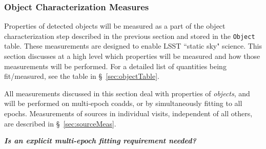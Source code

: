\documentclass[12pt]{article}
\newcommand{\code}[1]{\texttt{#1}}
\newcommand{\annotate}[1]{{\color{magenta}\large\textbf{\emph{#1}}}}
\newcommand{\Object}{\code{Object}\xspace}
\begin{document}
\subsubsection{Object Characterization Measures}
\label{sec:objchar}

Properties of detected objects will be measured as a part of the object characterization step described in the previous section and stored in the \Object table. These measurements are designed to enable LSST ``static sky" science. This section discusses at a high level which properties will be measured and how those measurements will be performed. For a detailed list of quantities being fit/measured, see the table in \S~\ref{sec:objectTable}.

All measurements discussed in this section deal with properties of {\em objects}, and will be performed on multi-epoch coadds, or by simultaneously fitting to all epochs. Measurements of sources in individual visits, independent of all others, are described in \S~\ref{sec:sourceMeas}.

\annotate{Is an explicit multi-epoch fitting requirement needed?}

\vspace{1em}
\end{document}
